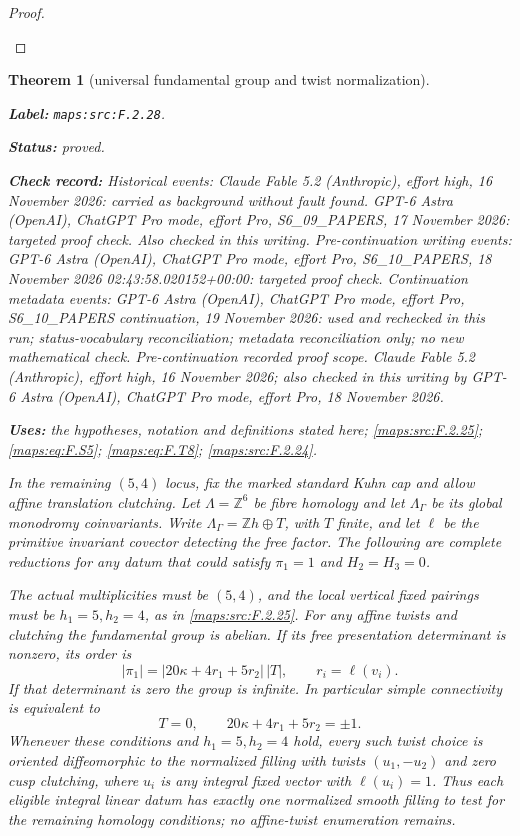 \documentclass[11pt,a4paper]{article}
\newtheorem{theorem}{Theorem}[section]
\theoremstyle{definition}
\newcommand{\StatementRecord}[4]{\par\smallskip\begingroup\upshape\raggedright\noindent\textbf{Label:} \nolinkurl{#1}.\par\noindent\textbf{Status:} #2.\par\noindent\textbf{Check record:} #3.\par\noindent\textbf{Uses:} #4.\par\endgroup\smallskip}
\begin{document}
\begin{proof}
\begin{enumerate}[label=\arabic*.]
\end{enumerate}
\end{proof}




\begin{theorem}[universal fundamental group and twist normalization]\label{maps:src:F.2.28}
\StatementRecord{maps:src:F.2.28}{proved}{Historical events: Claude Fable 5.2 (Anthropic), effort high, 16 November 2026: carried as background without fault found. GPT-6 Astra (OpenAI), ChatGPT Pro mode, effort Pro, S6\_09\_PAPERS, 17 November 2026: targeted proof check. Also checked in this writing. Pre-continuation writing events: GPT-6 Astra (OpenAI), ChatGPT Pro mode, effort Pro, S6\_10\_PAPERS, 18 November 2026 02:43:58.020152+00:00: targeted proof check. Continuation metadata events: GPT-6 Astra (OpenAI), ChatGPT Pro mode, effort Pro, S6\_10\_PAPERS continuation, 19 November 2026: used and rechecked in this run; status-vocabulary reconciliation; metadata reconciliation only; no new mathematical check. \emph{Pre-continuation recorded proof scope.} Claude Fable 5.2 (Anthropic), effort high, 16 November 2026; also checked in this writing by GPT-6 Astra (OpenAI), ChatGPT Pro mode, effort Pro, 18 November 2026}{the hypotheses, notation and definitions stated here; \cref{maps:src:F.2.25}; \cref{maps:eq:F.S5}; \cref{maps:eq:F.T8}; \cref{maps:src:F.2.24}}


In the remaining $(5,4)$ locus, fix the marked standard Kuhn
cap and allow affine translation clutching.
Let $\Lambda=\mathbb Z^6$ be fibre homology and let
$\Lambda_\Gamma$ be its global monodromy coinvariants.
Write $\Lambda_\Gamma=\mathbb Zh\oplus T$, with $T$ finite,
and let $\ell$ be the primitive invariant covector detecting
the free factor.  The following are complete reductions for
any datum that could satisfy $\pi_1=1$ and $H_2=H_3=0$.

The actual multiplicities must be $(5,4)$, and the local
vertical fixed pairings must be $h_1=5,h_2=4$, as in \ref{maps:src:F.2.25}.
For any affine twists and clutching the fundamental group
is abelian.  If its free presentation determinant is nonzero,
its order is
\[
 |\pi_1|=|20\kappa+4r_1+5r_2|\,|T|,
 \qquad r_i=\ell(v_i).
 \tag{F.T11}\label{maps:eq:F.T11}
\]
If that determinant is zero the group is infinite.
In particular simple connectivity is equivalent to
\[
 T=0,\qquad 20\kappa+4r_1+5r_2=\pm1.
 \tag{F.T12}\label{maps:eq:F.T12}
\]
Whenever these conditions and $h_1=5,h_2=4$ hold, every
such twist choice is oriented diffeomorphic to the normalized
filling with twists $(u_1,-u_2)$ and zero cusp clutching,
where $u_i$ is any integral fixed vector with $\ell(u_i)=1$.
Thus each eligible integral linear datum has exactly one
normalized smooth filling to test for the remaining
homology conditions; no affine-twist enumeration remains.

\end{theorem}
\end{document}
